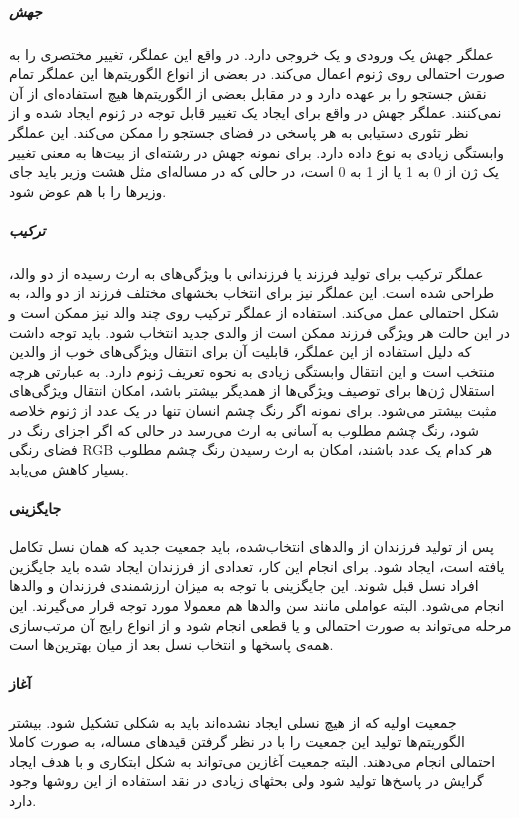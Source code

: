 \documentclass{report}
\begin{document}
\subparagraph{جهش}
عملگر جهش یک ورودی و یک خروجی دارد. در واقع این عملگر، تغییر مختصری را به صورت احتمالی روی ژنوم اعمال می‌کند. در بعضی از انواع الگوریتم‌ها این عملگر تمام نقش جستجو را بر عهده دارد و در مقابل بعضی از الگوریتم‌ها هیچ استفاده‌ای از آن نمی‌کنند. عملگر جهش در واقع برای ایجاد یک تغییر قابل توجه در ژنوم ایجاد شده و از نظر تئوری دستیابی به هر پاسخی در فضای جستجو را ممکن می‌کند. این عملگر وابستگی زیادی به نوع داده دارد. برای نمونه جهش در رشته‌ای از بیت‌ها به معنی تغییر یک ژن از 0 به 1 یا از 1 به 0 است، در حالی که در مساله‌ای مثل هشت وزیر باید جای وزیرها را با هم عوض شود.

\subparagraph{ترکیب}
عملگر ترکیب برای تولید فرزند یا فرزندانی با ویژگی‌های به ارث رسیده از دو والد، طراحی شده است. این عملگر نیز برای انتخاب بخشهای مختلف فرزند از دو والد، به شکل احتمالی عمل می‌کند. استفاده از عملگر ترکیب روی چند والد نیز ممکن است و در این حالت هر ویژگی فرزند ممکن است از والدی جدید انتخاب شود. باید توجه داشت که دلیل استفاده از این عملگر، قابلیت آن برای انتقال ویژگی‌های خوب از والدین منتخب است و این انتقال وابستگی زیادی به نحوه تعریف ژنوم دارد. به عبارتی هرچه استقلال ژن‌ها برای توصیف ویژگی‌ها از همدیگر بیشتر باشد، امکان انتقال ویژگی‌های مثبت بیشتر می‌شود. برای نمونه اگر رنگ چشم انسان تنها در یک عدد از ژنوم خلاصه شود، رنگ چشم مطلوب به آسانی به ارث می‌رسد در حالی که اگر اجزای رنگ در فضای رنگی RGB هر کدام یک عدد باشند، امکان به ارث رسیدن رنگ چشم مطلوب بسیار کاهش می‌یابد.

\paragraph{جایگزینی}
پس از تولید فرزندان از والدهای انتخاب‌شده، باید جمعیت جدید که همان نسل تکامل یافته است، ایجاد شود. برای انجام این کار، تعدادی از فرزندان ایجاد شده باید جایگزین افراد نسل قبل شوند. این جایگزینی با توجه به میزان ارزشمندی فرزندان و والدها انجام می‌شود. البته عواملی مانند سن والدها هم معمولا مورد توجه قرار می‌گیرند. این مرحله می‌تواند به صورت احتمالی و یا قطعی انجام شود و از انواع رایج آن مرتب‌سازی همه‌ی پاسخها و انتخاب نسل بعد از میان بهترین‌ها است.

\paragraph{آغاز}
جمعیت اولیه که از هیچ نسلی ایجاد نشده‌اند باید به شکلی تشکیل شود. بیشتر الگوریتم‌ها تولید این جمعیت را با در نظر گرفتن قیدهای مساله، به صورت کاملا احتمالی انجام می‌دهند. البته جمعیت آغازین می‌تواند به شکل ابتکاری و با هدف ایجاد گرایش در پاسخ‌ها تولید شود ولی بحثهای زیادی در نقد استفاده از این روشها وجود دارد.
\end{document}
